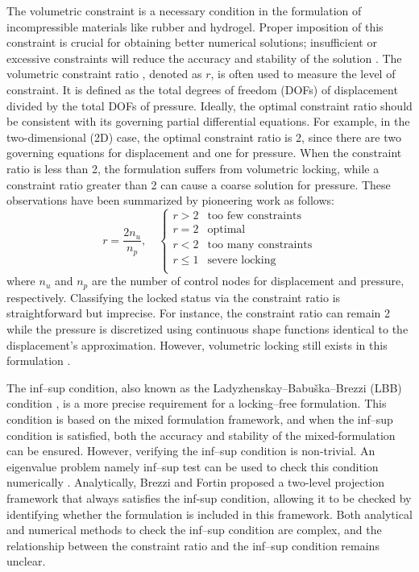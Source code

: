 The volumetric constraint is a necessary condition in the formulation of incompressible materials like rubber and hydrogel.
Proper imposition of this constraint is crucial for obtaining better numerical solutions; insufficient or excessive constraints will reduce the accuracy and stability of the solution \cite{brezzi1991a}.
The volumetric constraint ratio \cite{hughes2000}, denoted as $r$, is often used to measure the level of constraint.
It is defined as the total degrees of freedom (DOFs) of displacement divided by the total DOFs of pressure.
Ideally, the optimal constraint ratio should be consistent with its governing partial differential equations.
For example, in the two-dimensional (2D) case, the optimal constraint ratio is 2, since there are two governing equations for displacement and one for pressure.
When the constraint ratio is less than 2, the formulation suffers from volumetric locking, while a constraint ratio greater than 2 can cause a coarse solution for pressure.
These observations have been summarized by pioneering work \cite{hughes2000} as follows:
\begin{equation}
r = \frac{2n_u}{n_p}, \quad
\begin{cases}
r > 2 & \text{too few constraints} \\
r = 2 & \text{optimal} \\
r < 2 & \text{too many constraints} \\
r \le 1 & \text{severe locking} \\
\end{cases}
\end{equation}
where $n_u$ and $n_p$ are the number of control nodes for displacement and pressure, respectively.
Classifying the locked status via the constraint ratio is straightforward but imprecise.
For instance, the constraint ratio can remain 2 while the pressure is discretized using continuous shape functions identical to the displacement's approximation.
However, volumetric locking still exists in this formulation \cite{hughes2000}.

The inf--sup condition, also known as the Ladyzhenskay--Babuška--Brezzi (LBB) condition \cite{babuska1997a,bathe1996}, is a more precise requirement for a locking--free formulation.
This condition is based on the mixed formulation framework, and when the inf--sup condition is satisfied, both the accuracy and stability of the mixed-formulation can be ensured.
However, verifying the inf--sup condition is non-trivial.
An eigenvalue problem namely inf--sup test can be used to check this condition numerically \cite{malkus1981,chapelle1993,brezzi,gallistl2019}.
Analytically, Brezzi and Fortin proposed a two-level projection framework that always satisfies the inf-sup condition,
allowing it to be checked by identifying whether the formulation is included in this framework.
Both analytical and numerical methods to check the inf--sup condition are complex,
and the relationship between the constraint ratio and the inf--sup condition remains unclear.

